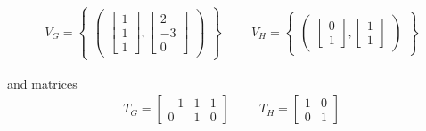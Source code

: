 \begin{align*}
	V_G = 
	\begin{Bmatrix}
		\begin{pmatrix}
			\begin{bmatrix}
				1 \\
				1 \\
				1
			\end{bmatrix},
			\begin{bmatrix}
				2 \\
				-3 \\
				0
			\end{bmatrix}
		\end{pmatrix}
	\end{Bmatrix} \hspace{1cm}
	V_H =\begin{Bmatrix}
		\begin{pmatrix}
			\begin{bmatrix}
				0 \\
				1
			\end{bmatrix},
			\begin{bmatrix}
				1 \\
				1
			\end{bmatrix}
		\end{pmatrix}
	\end{Bmatrix}
\end{align*}

and matrices
\begin{align*}
	T_G = \begin{bmatrix}  -1 & 1 & 1 \\ 0 & 1 & 0\end{bmatrix} \hspace{1cm} T_H = \begin{bmatrix}  1 & 0 \\  0 & 1\end{bmatrix}
\end{align*}

